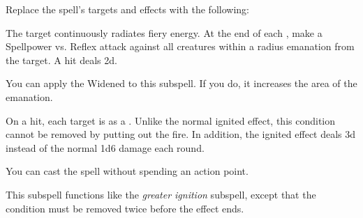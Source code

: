 Replace the spell's targets and effects with the following:
\begin{spellcontent}

\begin{augmenttargetinginfo}



\end{augmenttargetinginfo}


\begin{augmenteffects}



\spelleffect
The target continuously radiates fiery energy.
At the end of each , make a Spellpower vs. Reflex attack against all creatures within a \areamed radius emanation from the target.
A hit deals  \minus2d.

You can apply the Widened  to this subspell.
If you do, it increases the area of the emanation.








\end{augmenteffects}

\end{spellcontent}






On a hit, each target is  as a .
Unlike the normal ignited effect, this condition cannot be removed by putting out the fire.
In addition, the ignited effect deals  \minus3d instead of the normal 1d6 damage each round.






You can cast the spell without spending an action point.






This subspell functions like the \textit{greater ignition} subspell, except that the condition must be removed twice before the effect ends.





